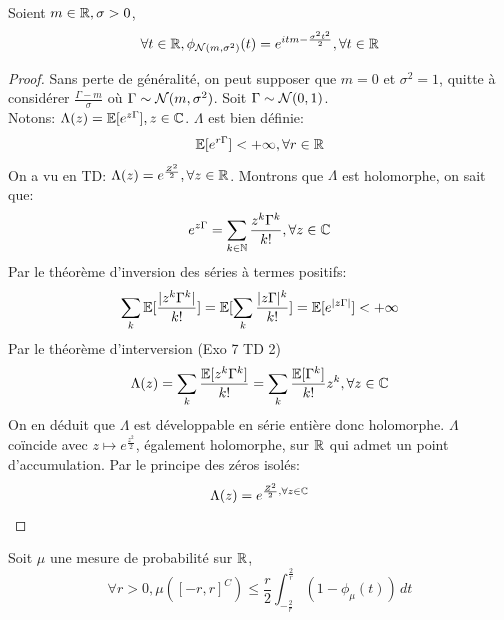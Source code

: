 \documentclass[]{report}
\begin{document}
    \begin{prop}{}{}
        Soient $m\in \mathbb{R},\sigma>0$,
        \[\forall t\in \mathbb{R},\phi_{\mathcal{N}(m,\sigma^2)}(t)=e^{itm-\frac{\sigma^2 t^2}{2}},\forall t\in \mathbb{R}\]
    \end{prop}

    \begin{proof}
        Sans perte de généralité, on peut supposer que $m=0$ et $\sigma^2=1$, quitte à considérer $\frac{\Gamma-m}{\sigma}$ où $\Gamma\sim \mathcal{N}(m,\sigma^2)$. Soit $\Gamma \sim \mathcal{N}(0,1)$.\\
        Notons: $\Lambda(z)=\mathbb{E}[e^{z\Gamma}],z\in \mathbb{C}$. $\Lambda$ est bien définie:
        \[\mathbb{E}[e^{r\Gamma}]<+\infty,\forall r\in \mathbb{R}\]
        On a vu en TD: $\Lambda(z)=e^{\frac{Z^2}{2}},\forall z\in \mathbb{R}$. Montrons que $\Lambda$ est holomorphe, on sait que:
        \[e^{z\Gamma}=\sum_{k\in \mathbb{N}}\frac{z^{k}\Gamma^{k}}{k!},\forall z\in \mathbb{C}\]
        Par le théorème d'inversion des séries à termes positifs:
        \[\sum_k \mathbb{E}[\frac{|z^k\Gamma^k|}{k!}]=\mathbb{E}[\sum_k \frac{|z\Gamma|^k}{k!}]=\mathbb{E}[e^{|z\Gamma|}]<+\infty\]
        Par le théorème d'interversion (Exo 7 TD 2)
        \[\Lambda(z)=\sum_k\frac{\mathbb{E}[z^k\Gamma^k]}{k!}=\sum_k\frac{\mathbb{E}[\Gamma^k]}{k!}z^k,\forall z\in \mathbb{C}\]
        On en déduit que $\Lambda$ est développable en série entière donc holomorphe. $\Lambda$ coïncide avec $z\mapsto e^{\frac{z^2}{2}}$, également holomorphe, sur $\mathbb{R}$ qui admet un point d'accumulation. Par le principe des zéros isolés:
        \[\Lambda(z)=e^{\frac{Z^2}{2},\forall z\in \mathbb{C}}\]
    \end{proof}

    \begin{lm}{}{}
        Soit $\mu$ une mesure de probabilité sur $\mathbb{R}$,
        \[\forall r>0,\mu\left([-r,r]^C\right)\le \frac{r}{2}\int_{-\frac{2}{r}}^{\frac{2}{r}}(1-\phi_\mu(t))\,dt\]
    \end{lm}
\end{document}
